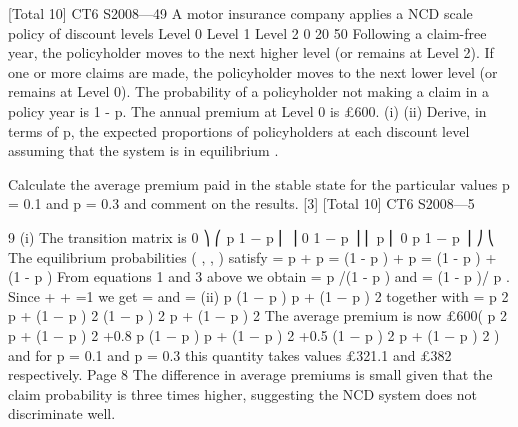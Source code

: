 \documentclass[a4paper,12pt]{article}
\begin{document}
[Total 10]
CT6 S2008—49
A motor insurance company applies a NCD scale policy of discount levels
Level 0
Level 1
Level 2
0%
20%
50%
Following a claim-free year, the policyholder moves to the next higher level (or
remains at Level 2). If one or more claims are made, the policyholder moves to the
next lower level (or remains at Level 0).
The probability of a policyholder not making a claim in a policy year is 1 - p.
The annual premium at Level 0 is £600.
(i)
(ii)
Derive, in terms of p, the expected proportions of policyholders at each
discount level assuming that the system is in equilibrium .

Calculate the average premium paid in the stable state for the particular values
p = 0.1 and p = 0.3 and comment on the results.
[3]
[Total 10]
CT6 S2008—5

9
(i)
The transition matrix is
0 ⎞
⎛ p 1 − p
⎜
⎟
0
1 − p ⎟
⎜ p
⎜ 0
p 1 − p ⎟ ⎠
⎝
The equilibrium probabilities (  ,  ,  ) satisfy
 = p  + p 
 =  (1 - p ) + p 
 =  (1 - p ) + (1 - p ) 
From equations 1 and 3 above we obtain
 = p /(1 - p )  and  = (1 - p )/ p  .
Since  +  +  =1 we get  =
and  =
(ii)
p (1 − p )
p + (1 − p ) 2
together with  =
p 2
p + (1 − p ) 2
(1 − p ) 2
p + (1 − p ) 2
The average premium is now
£600(
p 2
p + (1 − p ) 2
+0.8
p (1 − p )
p + (1 − p ) 2
+0.5
(1 − p ) 2
p + (1 − p ) 2
) and for
p = 0.1 and p = 0.3 this quantity takes values £321.1 and £382 respectively.
Page 8%
The difference in average premiums is small given that the claim probability is
three times higher, suggesting the NCD system does not discriminate well.
\end{document}
